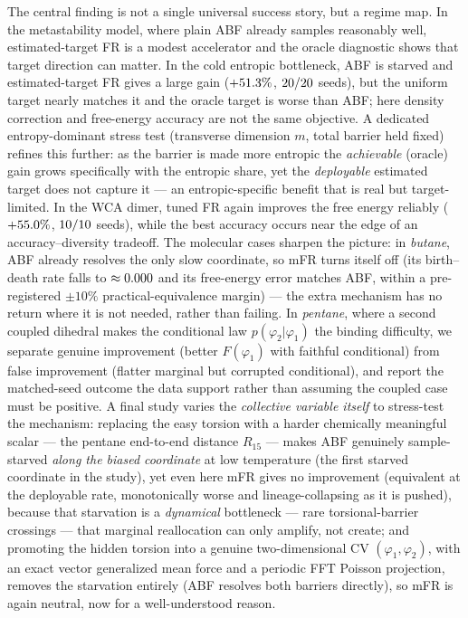 The central finding is not a single universal success story, but a regime map. In
the metastability model, where plain ABF already samples reasonably well,
estimated-target FR is a modest accelerator and the oracle diagnostic shows that
target direction can matter. In the cold entropic bottleneck, ABF is starved and
estimated-target FR gives a large gain ($+51.3\%$, $20/20$ seeds),
but the uniform target nearly matches it and the oracle target is worse than ABF;
here density correction and free-energy accuracy are not the same objective. A
dedicated entropy-dominant stress test (transverse dimension $m$, total barrier
held fixed) refines this further: as the barrier is made more entropic the
\emph{achievable} (oracle) gain grows specifically with the entropic share, yet the
\emph{deployable} estimated target does not capture it --- an entropic-specific
benefit that is real but target-limited. In
the WCA dimer, tuned FR again improves the free energy reliably
($+55.0\%$, $10/10$ seeds), while the best accuracy occurs
near the edge of an accuracy--diversity tradeoff. The molecular cases sharpen the
picture: in \emph{butane}, ABF already resolves the only slow coordinate, so mFR
turns itself off (its birth--death rate falls to $\approx0.000$ and its
free-energy error matches ABF, \textbf{\AlkButaneVerdict} within a pre-registered
$\pm10\%$ practical-equivalence margin) --- the extra mechanism has no return where
it is not needed, rather than failing. In \emph{pentane}, where a second coupled
dihedral makes the conditional law $p(\varphi_2|\varphi_1)$ the binding difficulty,
we separate genuine improvement (better $F(\varphi_1)$ with faithful conditional)
from false improvement (flatter marginal but corrupted conditional), and report the
matched-seed outcome the data support rather than assuming the coupled case must be
positive. A final study varies the \emph{collective variable itself} to stress-test the
mechanism: replacing the easy torsion with a harder chemically meaningful scalar --- the
pentane end-to-end distance $R_{15}$ --- makes ABF genuinely sample-starved \emph{along the
biased coordinate} at low temperature (the first starved coordinate in the study), yet even
here mFR gives no improvement (equivalent at the deployable rate, monotonically worse and
lineage-collapsing as it is pushed), because that starvation is a \emph{dynamical} bottleneck
--- rare torsional-barrier crossings --- that marginal reallocation can only amplify, not
create; and promoting the hidden torsion into a genuine two-dimensional CV $(\varphi_1,
\varphi_2)$, with an exact vector generalized mean force and a periodic FFT Poisson
projection, removes the starvation entirely (ABF resolves both barriers directly), so mFR is
again neutral, now for a well-understood reason.

